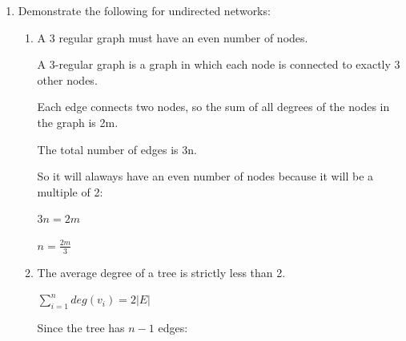 \documentclass{amsart}
\theoremstyle{definition}
\theoremstyle{remark}
\numberwithin{equation}{section}
\begin{document}
\clearpage
\begin{enumerate}


\item Demonstrate the following for undirected networks:
\begin{enumerate}
\item A 3 regular graph must have an even number of nodes.\vspace{0.2cm}

A 3-regular graph is a graph in which each node is connected to exactly 3 other nodes.

\vspace{0.2cm}

Each edge connects two nodes, so the sum of all degrees of the nodes in the graph is 2m.

\vspace{0.2cm}

The total number of edges is 3n.

\vspace{0.2cm}

So it will alaways have an even number of nodes because it will be a multiple of 2:

\vspace{0.2cm}

$
3n = 2m
$

\vspace{0.2cm}

$
n = \frac{2m}{3}
$

\vspace{0.2cm}

\item The average degree of a tree is strictly less than 2.

\vspace{0.2cm}

$ \sum_{i=1}^{n} deg(v_i) = 2|E| $

\vspace{0.2cm}

Since the tree has \(n-1\) edges:

\vspace{0.2cm}


\end{enumerate}
\end{enumerate}
\end{document}
